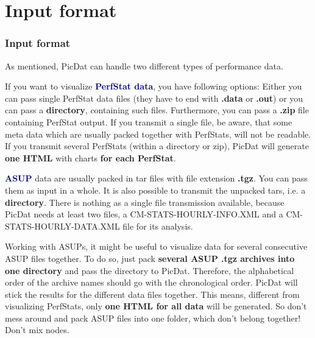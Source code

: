 \documentclass[8pt]{beamer}
\begin{document}
\section{Input format}
\begin{frame}
\frametitle{Input format}
As mentioned, PicDat can handle two different types of performance data.
\bigskip

If you want to visualize \textcolor{darkblue}{\textbf{PerfStat data}}, you have following options: Either you can pass single PerfStat data files (they have to end with \textbf{.data} or \textbf{.out}) or you can pass a \textbf{directory}, containing such files. Furthermore, you can pass a \textbf{.zip} file containing PerfStat output. If you transmit a single file, be aware, that some meta data which are usually packed together with PerfStats, will not be readable. If you transmit several PerfStats (within a directory or zip), PicDat will generate \textbf{one HTML} with charts \textbf{for each PerfStat}. 
\bigskip

\textcolor{darkblue}{\textbf{ASUP}} data are usually packed in tar files with file extension \textbf{.tgz}. You can pass them as input in a whole. It is also possible to transmit the unpacked tars, i.e. a \textbf{directory}. There is nothing as a single file transmission available, because PicDat needs at least two files, a CM-STATS-HOURLY-INFO.XML and a CM-STATS-HOURLY-DATA.XML file for its analysis. 

Working with ASUPs, it might be useful to visualize data for several consecutive ASUP files together. To do so, just pack \textbf{several ASUP .tgz archives into one directory} and pass the directory to PicDat. Therefore, the alphabetical order of the archive names should go with the chronological order. PicDat will stick the results for the different data files together. This means, different from visualizing PerfStats, only \textbf{one HTML for all data} will be generated. So don't mess around and pack ASUP files into one folder, which don't belong together! Don't mix nodes.
\end{frame}
\end{document}
